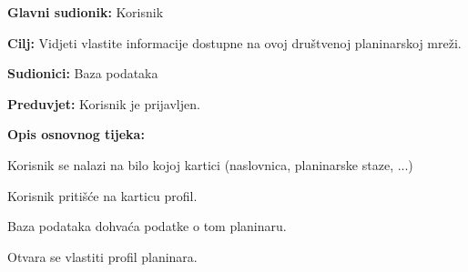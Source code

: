 		\noindent {}
		\begin{packed_item}
			
			\item \textbf{Glavni sudionik: } Korisnik
			\item  \textbf{Cilj:} Vidjeti vlastite informacije dostupne na ovoj društvenoj planinarskoj mreži.
			\item  \textbf{Sudionici:} Baza podataka
			\item  \textbf{Preduvjet:} Korisnik je prijavljen.
			\item  \textbf{Opis osnovnog tijeka:}
			
			\item[] \begin{packed_enum}
				
				\item Korisnik se nalazi na bilo kojoj kartici (naslovnica, planinarske staze, ...)
				\item Korisnik pritišće na karticu profil.
				\item Baza podataka dohvaća podatke o tom planinaru.
				\item Otvara se vlastiti profil planinara.
				
			\end{packed_enum}
		\end{packed_item}
	
